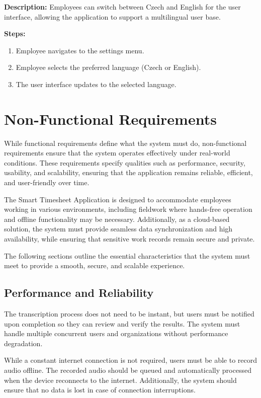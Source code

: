 \documentclass[
  digital,     %
  oneside,     %
  nosansbold,  %
  nocolorbold, %
  lof,         %
  lot,         %
]{fithesis4}
\begin{document}
\noindent \textbf{Description:}  
Employees can switch between Czech and English for the user interface, allowing the application to support a multilingual user base.

\noindent \textbf{Steps:}
\begin{enumerate}
    \item Employee navigates to the settings menu.
    \item Employee selects the preferred language (Czech or English).
    \item The user interface updates to the selected language.
\end{enumerate}

\section{Non-Functional Requirements}

While functional requirements define what the system must do, non-functional requirements ensure that the system operates effectively under real-world conditions. These requirements specify qualities such as performance, security, usability, and scalability, ensuring that the application remains reliable, efficient, and user-friendly over time.  

The Smart Timesheet Application is designed to accommodate employees working in various environments, including fieldwork where hands-free operation and offline functionality may be necessary. Additionally, as a cloud-based solution, the system must provide seamless data synchronization and high availability, while ensuring that sensitive work records remain secure and private.  

The following sections outline the essential characteristics that the system must meet to provide a smooth, secure, and scalable experience.

\subsection{Performance and Reliability}  
The transcription process does not need to be instant, but users must be notified upon completion so they can review and verify the results. The system must handle multiple concurrent users and organizations without performance degradation.  

While a constant internet connection is not required, users must be able to record audio offline. The recorded audio should be queued and automatically processed when the device reconnects to the internet. Additionally, the system should ensure that no data is lost in case of connection interruptions.
\end{document}
